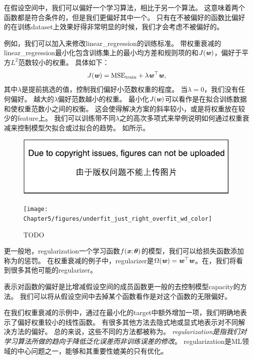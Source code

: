 在假设空间中，我们可以偏好一个学习算法，相比于另一个算法。
这意味着两个函数都是符合条件的，但是我们更偏好其中一个。
只有在不被偏好的函数比偏好的在训练\gls{dataset}上效果好得非常明显的时候，我们才会考虑不被偏好的。


例如，我们可以加入来修改\gls{linear_regression}的训练标准。
带权重衰减的\gls{linear_regression}最小化包含训练集上的最小均方差和规则项的和$J(\boldsymbol{\mathit{w}})$，偏好于平方$L^2$范数较小的权重。
具体如下：
\begin{equation}
    J(\boldsymbol{\mathit{w}}) = \text{MSE}_{\text{train}} + \lambda \boldsymbol{\mathit{w}}^\top \boldsymbol{\mathit{w}},
\end{equation}
其中$\lambda$是提前挑选的值，控制我们偏好小范数权重的程度。
当$\lambda =0$，我们没有任何偏好。
越大的$\lambda$偏好范数越小的权重。
最小化$J(\boldsymbol{\mathit{w}})$可以看作是在拟合训练数据和使权重范数小之间的权衡。
这会使得解决方案的斜率较小，或是将权重放在较少的\gls{feature}上。
我们可以训练带不同$\lambda$之的高次多项式来举例说明如何通过权重衰减来控制模型欠拟合或过拟合的趋势。
如所示。

\begin{figure}[!htb]
\ifOpenSource
\centerline{\includegraphics{figure.pdf}}
\else
\centerline{\texttt{[image: Chapter5/figures/underfit\_just\_right\_overfit\_wd\_color]}}
\fi
\caption{TODO}
\label{fig:chap5_underfit_just_right_overfit_wd_color}
\end{figure}

更一般地，\gls{regularization}一个学习函数$f(\boldsymbol{\mathit{x}};\boldsymbol{\theta})$的模型，我们可以给损失函数添加称为的惩罚。
在权重衰减的例子中，\gls{regularizer}是$\Omega(\boldsymbol{\mathit{w}}) = \boldsymbol{\mathit{w}}^\top \boldsymbol{\mathit{w}}$。在，我们将看到很多其他可能的\gls{regularizer}。


表示对函数的偏好是比增减假设空间的成员函数更一般的去控制模型\gls{capacity}的方法。
我们可以将从假设空间中去掉某个函数看作是对这个函数的无限偏好。

在我们权重衰减的示例中，通过在最小化的\gls{target}中额外增加一项，我们明确地表示了偏好权重较小的线性函数。
有很多其他方法去隐式地或显式地表示对不同解决方法的偏好。
总的来说，这些不同的方法都被称为。
\emph{\gls{regularization}是指我们对学习算法所做的趋向于降低泛化误差而非训练误差的修改}。
\gls{regularization}是\gls{ML}领域的中心问题之一，能够和其重要性媲美的只有优化。


